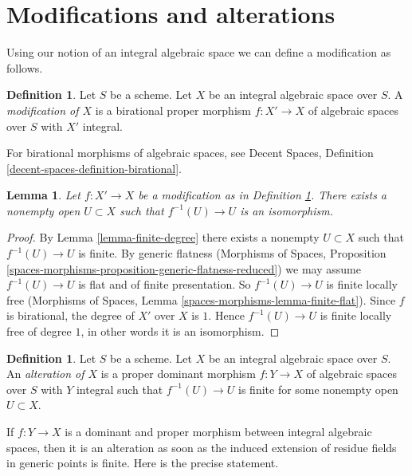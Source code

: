 \documentclass{stacks-project}
\theoremstyle{plain}
\newtheorem{lemma}[subsection]{Lemma}
\theoremstyle{definition}
\newtheorem{definition}[subsection]{Definition}
\theoremstyle{remark}
\numberwithin{equation}{subsection}
\begin{document}
\section{Modifications and alterations}
\label{section-modifications-alterations}

\noindent
Using our notion of an integral algebraic space we can define a modification
as follows.

\begin{definition}
\label{definition-modification}
Let $S$ be a scheme. Let $X$ be an integral algebraic space over $S$. A
{\it modification of $X$} is a birational proper morphism
$f : X' \to X$ of algebraic spaces over $S$ with $X'$ integral.
\end{definition}

\noindent
For birational morphisms of algebraic spaces, see
Decent Spaces, Definition \ref{decent-spaces-definition-birational}.

\begin{lemma}
\label{lemma-modification-iso-over-open}
Let $f : X' \to X$ be a modification as in
Definition \ref{definition-modification}.
There exists a nonempty open $U \subset X$ such that $f^{-1}(U) \to U$
is an isomorphism.
\end{lemma}

\begin{proof}
By
Lemma \ref{lemma-finite-degree} there exists a nonempty $U \subset X$ such
that $f^{-1}(U) \to U$ is finite. By generic flatness
(Morphisms of Spaces, Proposition
\ref{spaces-morphisms-proposition-generic-flatness-reduced})
we may assume $f^{-1}(U) \to U$ is flat and of finite presentation.
So $f^{-1}(U) \to U$ is finite locally free
(Morphisms of Spaces, Lemma \ref{spaces-morphisms-lemma-finite-flat}).
Since $f$ is birational, the degree of $X'$ over $X$ is $1$.
Hence $f^{-1}(U) \to U$ is finite locally free of degree $1$,
in other words it is an isomorphism.
\end{proof}

\begin{definition}
\label{definition-alteration}
Let $S$ be a scheme. Let $X$ be an integral algebraic space over $S$.
An {\it alteration of $X$} is a proper dominant morphism $f : Y \to X$
of algebraic spaces over $S$ with $Y$ integral such that $f^{-1}(U) \to U$
is finite for some nonempty open $U \subset X$.
\end{definition}

\noindent
If $f : Y \to X$ is a dominant and proper morphism between integral
algebraic spaces, then it is an alteration as soon as the induced
extension of residue fields in generic points is finite. Here is the
precise statement.
\end{document}
